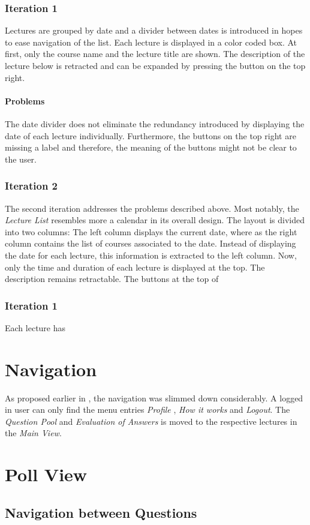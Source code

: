 \subsubsection{Iteration 1}
Lectures are grouped by date and a divider between dates is introduced in hopes to ease navigation of the list. Each lecture is displayed in a color coded box. At first, only the course name and the lecture title are shown. The description of the lecture below is retracted and can be expanded by pressing the button on the top right.
\paragraph{Problems}
The date divider does not eliminate the redundancy introduced by displaying the date of each lecture individually. Furthermore, the buttons on the top right are missing a label and therefore, the meaning of the buttons might not be clear to the user.


\subsubsection{Iteration 2}
The second iteration addresses the problems described above. Most notably, the \emph{Lecture List} resembles more a calendar in its overall design. The layout is divided into two columns: The left column displays the current date, where as the right column contains the list of courses associated to the date. Instead of displaying the date for each lecture, this information is extracted to the left column. Now, only the time and duration of each lecture is displayed at the top. The description remains retractable. The buttons at the top of 


\subsubsection{Iteration 1}
Each lecture has


\section{Navigation}
As proposed earlier in , the navigation was slimmed down considerably. A logged in user can only find the menu entries \emph{Profile}
, \emph{How it works} and \emph{Logout}.
The \emph{Question Pool} and \emph{Evaluation of Answers} is moved to the respective lectures in the \emph{Main View}.

\section{Poll View}


\subsection{Navigation between Questions}

